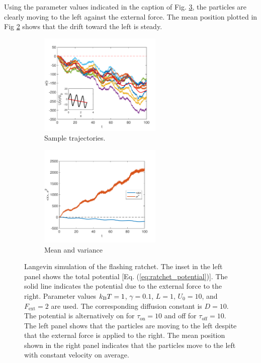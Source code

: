 Using the parameter values indicated in the caption of Fig. \ref{fig:ratchet_sim}, the particles are clearly moving to the left against the external force.  The mean position plotted in Fig \ref{fig:ratchet_stat} shows that the drift toward the left is steady.

\begin{figure}
	\centering
	\begin{subfigure}{0.45\textwidth}
		\centering
		\includegraphics[width=2.3in]{18.Langevin/ratchet_traject.pdf}
		\caption{Sample trajectories.}
		\label{fig:ratchet_traject}
	\end{subfigure}
	\begin{subfigure}{0.45\textwidth}
		\centering
		\includegraphics[width=2.3in]{18.Langevin/ratchet_stat.pdf}
		\caption{Mean and variance}
		\label{fig:ratchet_stat}
	\end{subfigure}
\caption{Langevin simulation of the flashing ratchet. The inset in the left panel shows the total potential [Eq. (\ref{eq:ratchet_potential})].  The solid line indicates the potential due to the external force to the right. Parameter values $k_\text{B} T=1$, $\gamma=0.1$, $L=1$, $U_0=10$, and $F_\text{ext}=2$ are used.  The corresponding diffusion constant is $D=10$.  The potential is alternatively on for $\tau_\text{on}=10$ and off for $\tau_\text{off}=10$.  The left panel shows that the particles are moving to the left despite that the external force is applied to the right.  The mean position shown in the right panel indicates that the particles move to the left with constant velocity on average.
}
\label{fig:ratchet_sim} 
\end{figure}

